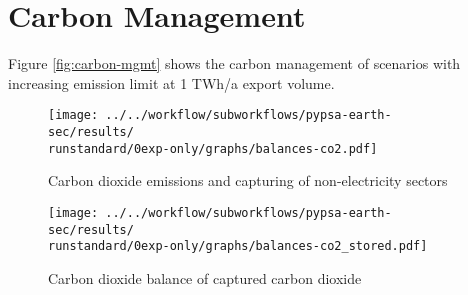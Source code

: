 \section{Carbon Management}
\label{subsec:carbon_mgmt}

Figure \ref{fig:carbon-mgmt} shows the carbon management of scenarios with increasing emission limit at 1 TWh/a export volume.


\begin{figure*}[h!]
    \centering
    \begin{subfigure}[b]{0.49\linewidth}
        \centering
        \texttt{[image: ../../workflow/subworkflows/pypsa-earth-sec/results/\\runstandard/0exp-only/graphs/balances-co2.pdf]}
        \caption{Carbon dioxide emissions and capturing of non-electricity sectors}
        \label{fig:carbon-atmo}
    \end{subfigure}
    \hfill
    \begin{subfigure}[b]{0.49\linewidth}
        \centering
        \texttt{[image: ../../workflow/subworkflows/pypsa-earth-sec/results/\\runstandard/0exp-only/graphs/balances-co2\_stored.pdf]}
        \caption{Carbon dioxide balance of captured carbon dioxide}
        \label{fig:carbon-store}
    \end{subfigure}
    \hfill
    \caption{Carbon dioxide \ref{fig:carbon-atmo} emissions and capturing as well as \ref{fig:carbon-store} management of captured carbon dioxide}
    \label{fig:carbon-mgmt}
\end{figure*}


\clearpage